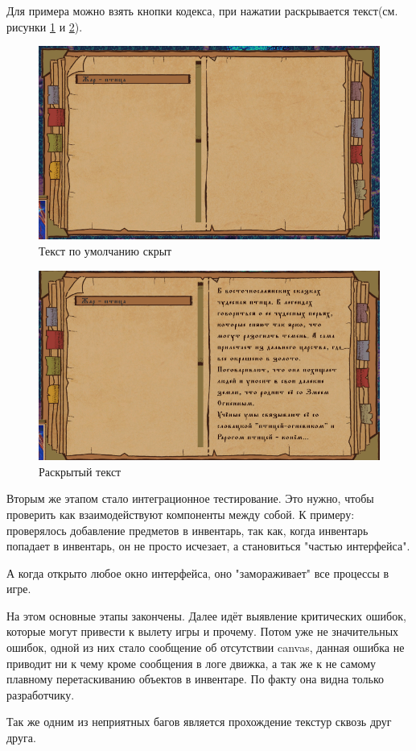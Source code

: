 \documentclass[bachelor, och, coursework, times]{SCWorks}
\begin{document}
    Для примера можно взять кнопки кодекса, при нажатии раскрывается текст(см. рисунки 
    \ref{fig:TextClose} и \ref{fig:TextOpen}).

 \begin{figure} [H]
        \centering
    \includegraphics[width=0.50\linewidth]{Pictures/Снимок экрана 2025-06-25 212028.png}
    \caption{Текст по умолчанию скрыт}
    \label{fig:TextClose}
    \end{figure}


 \begin{figure} [H]
        \centering
    \includegraphics[width=0.50\linewidth]{Pictures/Снимок экрана 2025-06-25 212038.png}
    \caption{Раскрытый текст}
    \label{fig:TextOpen}
    \end{figure}

    
    Вторым же этапом стало интеграционное тестирование. Это нужно, чтобы проверить
    как взаимодействуют компоненты между собой.
    К примеру: проверялось добавление предметов в инвентарь, так как,
    когда инвентарь попадает в инвентарь, он не просто исчезает, а становиться "частью интерфейса".
    
    А когда открыто любое окно интерфейса, оно "замораживает" все процессы в игре.

    На этом основные этапы закончены. Далее идёт выявление критических ошибок, которые могут привести
    к вылету игры и прочему. Потом уже не значительных ошибок, одной из них стало 
    сообщение об отсутствии canvas, данная ошибка не приводит ни к чему кроме сообщения в
    логе движка, а так же к не самому плавному перетаскиванию объектов в инвентаре.
     По факту она видна только разработчику. 

     Так же одним из неприятных багов является прохождение текстур сквозь друг друга.
\end{document}
